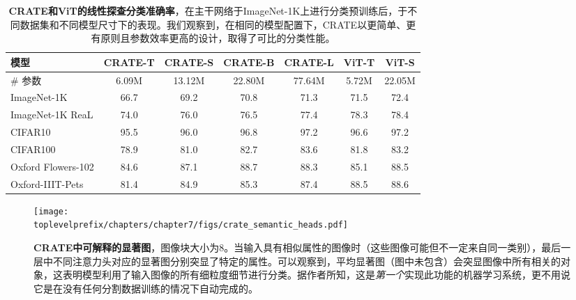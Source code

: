 \documentclass[../../book-main_zh.tex]{subfiles}
\begin{document}
\begin{table}
    \centering
    \begin{tabular}{@{}lcccc|cc@{}}
    \toprule
    \textbf{模型} & CRATE-T  &  CRATE-S & CRATE-B & CRATE-L & { \color{gray} ViT-T} &  { \color{gray}ViT-S } \\ 
    \midrule
    \midrule
     \# 参数 & 6.09M & 13.12M & 22.80M & 77.64M & { \color{gray} 5.72M} & { \color{gray} 22.05M} \\
    \midrule
     ImageNet-1K & 66.7 & 69.2 & 70.8 & 71.3 & { \color{gray} 71.5} & { \color{gray} 72.4} \\
     ImageNet-1K ReaL & 74.0 & 76.0 & 76.5 & 77.4 & { \color{gray} 78.3 } & { \color{gray} 78.4} \\
     CIFAR10 & 95.5 & 96.0 & 96.8 & 97.2 & { \color{gray} 96.6} & { \color{gray} 97.2} \\
     CIFAR100 & 78.9 & 81.0 & 82.7 & 83.6 & { \color{gray} 81.8} & { \color{gray} 83.2}\\
     Oxford Flowers-102 & 84.6 & 87.1 & 88.7 & 88.3 & { \color{gray} 85.1} & { \color{gray} 88.5}\\
     Oxford-IIIT-Pets & 81.4 & 84.9 & 85.3 & 87.4 & { \color{gray} 88.5} & { \color{gray} 88.6} \\
     \bottomrule
    \end{tabular}
    \caption{\small \textbf{CRATE和ViT的线性探查分类准确率}，在主干网络于ImageNet-1K上进行分类预训练后，于不同数据集和不同模型尺寸下的表现。我们观察到，在相同的模型配置下，CRATE以更简单、更有原则且参数效率更高的设计，取得了可比的分类性能。}
    \label{tab:crate_classification_linear_probing}
\end{table}

\begin{figure}
    \centering
    \texttt{[image: \\toplevelprefix/chapters/chapter7/figs/crate\_semantic\_heads.pdf]}
    \caption{\small\textbf{CRATE中可解释的显著图}，图像块大小为\(8\)。当输入具有相似属性的图像时（这些图像可能但不一定来自同一类别），最后一层中不同注意力头对应的显著图分别突显了特定的属性。可以观察到，平均显著图（图中未包含）会突显图像中所有相关的对象，这表明模型利用了输入图像的所有细粒度细节进行分类。据作者所知，这是\textit{第一个}实现此功能的机器学习系统，更不用说它是在没有任何分割数据训练的情况下自动完成的。}
    \label{fig:crate_semantic_heads}
\end{figure}
\end{document}
